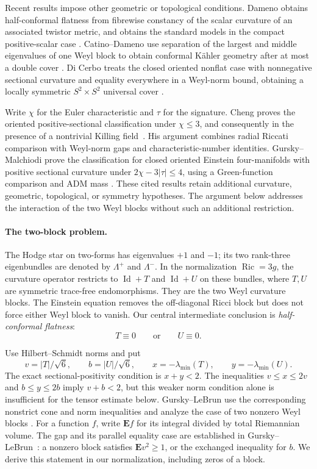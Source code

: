 Recent results impose other geometric or topological conditions.
Dameno obtains half-conformal flatness from fibrewise constancy of the
scalar curvature of an associated twistor metric, and obtains the
standard models in the compact positive-scalar case
\cite[Theorem~1.1 and Corollary~1.2]{Dameno2026}.
Catino--Dameno use separation of the largest and middle eigenvalues
of one Weyl block to obtain conformal K\"ahler geometry after at most a double cover
\cite[Theorems~1.1 and~1.4]{CatinoDameno2026}.
Di Cerbo treats the closed oriented nonflat case with nonnegative
sectional curvature and equality everywhere in a Weyl-norm bound,
obtaining a locally symmetric $S^2\times S^2$ universal cover
\cite[Proposition~3.2]{DiCerbo2026}.

Write $\chi$ for the Euler characteristic and $\tau$ for the signature.
Cheng proves the oriented positive-sectional classification under
$\chi\le3$, and consequently in the presence of a nontrivial Killing
field~\cite[Theorem~1.2 and Corollary~1.4]{Cheng2026}. His argument
combines radial Riccati comparison with Weyl-norm gaps and
characteristic-number identities. Gursky--Malchiodi prove the classification for closed oriented Einstein
four-manifolds with positive sectional curvature under
$2\chi-3|\tau|\le4$, using a Green-function comparison and ADM mass
\cite[Theorem~1.1]{GurskyMalchiodi2026}. These cited results retain
additional curvature, geometric, topological, or symmetry hypotheses.
The argument below addresses the interaction of the two Weyl blocks
without such an additional restriction.

\paragraph{The two-block problem.}
The Hodge star on two-forms has eigenvalues $+1$ and $-1$; its two
rank-three eigenbundles are denoted by $\Lambda^+$ and $\Lambda^-$.
In the normalization $\operatorname{Ric}=3g$, the curvature operator
restricts to $\operatorname{Id}+T$ and $\operatorname{Id}+U$ on these
bundles, where $T,U$ are symmetric trace-free endomorphisms. They are
the two Weyl curvature blocks. The Einstein equation removes the
off-diagonal Ricci block but does not force either Weyl block to vanish.
Our central intermediate conclusion is \emph{half-conformal flatness}:
\[
 T\equiv0\qquad\text{or}\qquad U\equiv0.
\]

Use Hilbert--Schmidt norms and put
\[
 v=|T|/\sqrt6,\qquad b=|U|/\sqrt6,\qquad
 x=-\lambda_{\min}(T),\qquad y=-\lambda_{\min}(U).
\]
The exact sectional-positivity condition is $x+y<2$. The inequalities
$v\le x\le2v$ and $b\le y\le2b$ imply $v+b<2$, but this weaker norm
condition alone is insufficient for the tensor estimate below.
Gursky--LeBrun use the corresponding nonstrict cone and norm inequalities
and analyze the case of two nonzero Weyl blocks
\cite[Lemma~1 and Theorem~B]{GurskyLeBrun1999}.
For a function $f$, write $\mathbf E f$ for its integral divided by total
Riemannian volume. The gap and its parallel equality case are established
in Gursky--LeBrun~\cite[Theorem~1]{GurskyLeBrun1999}: a nonzero block
satisfies $\mathbf E v^2\ge1$, or the exchanged inequality for $b$.
We derive this statement in our normalization, including zeros of a block.

